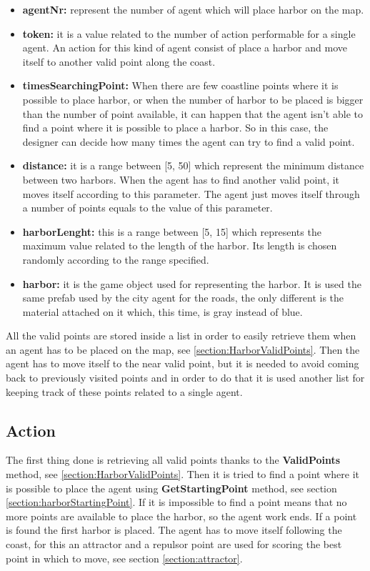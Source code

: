 \documentclass[12pt]{article}
\begin{document}
    \begin{itemize}
        \item \textbf{agentNr:} represent the number of agent which will place harbor on the map.
        \item \textbf{token:} it is a value related to the number of action performable for a single agent. An action for this kind of agent consist of place a harbor 
        and move itself to another valid point along the coast.
        \item \textbf{timesSearchingPoint:} When there are few coastline points where it is possible to place harbor, or when the number of harbor to be placed is bigger than
        the number of point available, it can happen that the agent isn't able to find a point where it is possible to place a harbor. So in this case, the designer can
        decide how many times the agent can try to find a valid point.
        \item \textbf{distance:} it is a range between [5, 50] which represent the minimum distance between two harbors. When the agent has to find another valid point,
        it moves itself according to this parameter. The agent just moves itself through a number of points equals to the value of this parameter. 
        \item \textbf{harborLenght:} this is a range between [5, 15] which represents the maximum value related to the length of the harbor. Its length is chosen randomly
        according to the range specified.  
        \item \textbf{harbor:} it is the game object used for representing the harbor. It is used the same prefab used by the city agent for the roads, the only different
        is the material attached on it which, this time, is gray instead of blue.
    \end{itemize}

    All the valid points are stored inside a list in order to easily retrieve them when an agent has to be placed on the map, see \ref{section:HarborValidPoints}. Then the 
    agent has to move itself to the near valid point, but it is needed to avoid coming back to previously visited points and in order to do that it is used another list
    for keeping track of these points related to a single agent.
    
    \subsection{Action}
    The first thing done is retrieving all valid points thanks to the \textbf{ValidPoints} method, see \ref{section:HarborValidPoints}. Then it is tried to find a point where it is possible to
    place the agent using \textbf{GetStartingPoint} method, see section \ref{section:harborStartingPoint}. If it is impossible to find a point means that no more points are available to place
    the harbor, so the agent work ends. If a point is found the first harbor is placed. The agent has to move itself following the coast, for this an attractor and a repulsor
    point are used for scoring the best point in which to move, see section \ref{section:attractor}.
    
\end{document}
